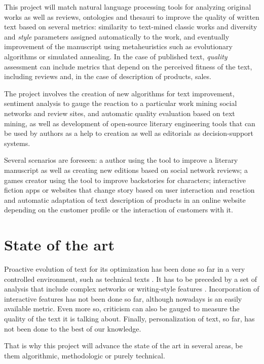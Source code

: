 \documentclass[a4paper]{article}
\begin{document}
This project will match natural language processing tools for
analyzing original works as well as reviews, ontologies and thesauri
to improve the quality of written text based on several metrics: similarity to
text-mined classic works and diversity and {\em style} parameters
assigned automatically to the work, and eventually improvement of the
manuscript using metaheuristics such as evolutionary algorithms or
simulated annealing. In the case of published text, {\em quality}
assessment can include metrics that depend on the perceived fitness of
the text, including reviews and, in the case of description of
products, sales.

The project involves the creation of new algorithms for text
improvement, sentiment analysis to gauge the reaction to a particular
work mining social networks and review sites, and automatic quality
evaluation based on text mining, as well as development of open-source
literary engineering tools that can be used by authors as a help to
creation as well as editorials as decision-support systems.  

Several scenarios are foreseen: a author using the tool to improve a
literary manuscript as well as creating new editions based on social
network reviews; a games creator using the tool to improve backstories
for characters; interactive fiction apps or websites that change story
based on user interaction and reaction and automatic adaptation of
text description of products in an online website depending on the
customer profile or the interaction of customers with it. 

\section{State of the art}

Proactive evolution of text for its optimization has been done so far
in a very controlled environment, such as technical texts
\cite{Rascu06acontrolled,hernandez2004checking}. It has to be preceded by a set of analysis
that include complex networks
\cite{1367-2630-14-4-043029,0295-5075-100-5-58002} or writing-style
features \cite{ASI:ASI20316}. Incorporation of interactive features
has not been done so far, although nowadays is an easily available
metric. Even more so, criticism can also be gauged to measure the
quality of the text it is talking about. Finally, personalization of
text, so far, has not been done to the best of our knowledge.

That is why this project will advance the state of the art in several
areas, be them algorithmic, methodologic or purely technical.
\end{document}
